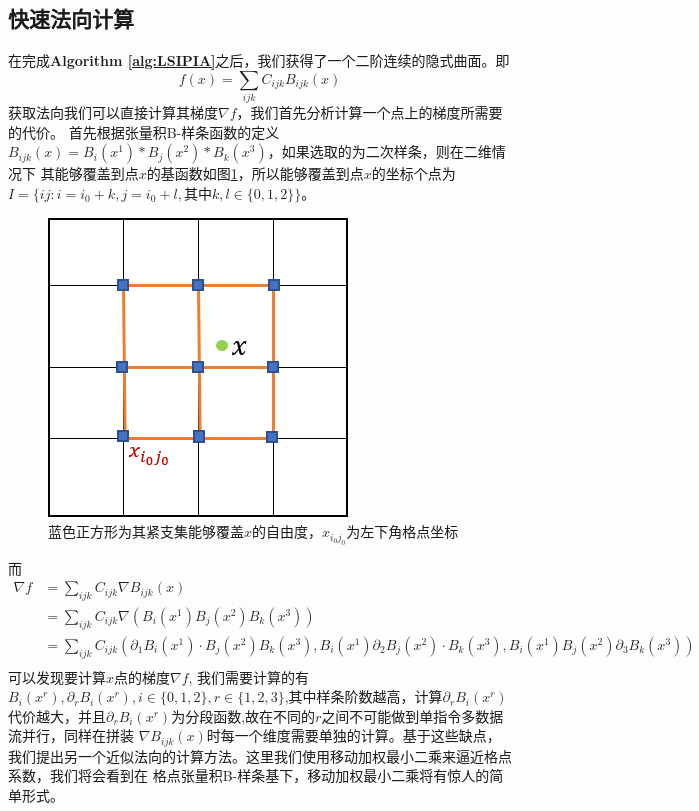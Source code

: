 \subsection{快速法向计算}
在完成\textbf{Algorithm \ref{alg:LSIPIA}}之后，我们获得了一个二阶连续的隐式曲面。即
\begin{equation}
    f(x) = \sum_{ijk} C_{ijk}B_{ijk}(x)
\end{equation}
获取法向我们可以直接计算其梯度$\nabla f$，我们首先分析计算一个点上的梯度所需要的代价。
首先根据张量积B-样条函数的定义$B_{ijk}(x) = B_i(x^1) * B_j(x^2) * B_k(x^3)$，如果选取的为二次样条，则在二维情况下
其能够覆盖到点$x$的基函数如图\ref{fig:2D basis}，所以能够覆盖到点$x$的坐标个点为$I = \{ij: i = i_0 + k, j = i_0 + l, \text{其中}k, l \in \{0,1,2\}\}$。
\begin{figure}[htbp]
    \centering
    \includegraphics[scale=1.0]{./images/image9.png}
    \caption{蓝色正方形为其紧支集能够覆盖$x$的自由度，$x_{i_0j_0}$为左下角格点坐标}
    \label{fig:2D basis}
\end{figure}

而
\begin{equation}
    \begin{split}
        \nabla f &= \sum_{ijk} C_{ijk} \nabla B_{ijk}(x)\\
        &= \sum_{ijk} C_{ijk} \nabla (B_i(x^1)B_j(x^2)B_k(x^3))\\
        &= \sum_{ijk} C_{ijk} (\partial_1 B_i(x^1) \cdot B_j(x^2)B_k(x^3), B_i(x^1)\partial_2 B_j(x^2)\cdot B_k(x^3), B_i(x^1)B_j(x^2)\partial_3B_k(x^3))\\
    \end{split}
\end{equation}
可以发现要计算$x$点的梯度$\nabla f$, 我们需要计算的有$B_i(x^r),\partial_r B_i(x^r), i \in \{0,1,2\}, r \in \{1,2,3\}$,其中样条阶数越高，计算$\partial_r B_i(x^r)$代价越大，并且$\partial_r B_i(x^r)$为分段函数,故在不同的$r$之间不可能做到单指令多数据流并行，同样在拼装
$\nabla B_{ijk}(x)$时每一个维度需要单独的计算。基于这些缺点，我们提出另一个近似法向的计算方法。这里我们使用移动加权最小二乘来逼近格点系数，我们将会看到在
格点张量积B-样条基下，移动加权最小二乘将有惊人的简单形式。

